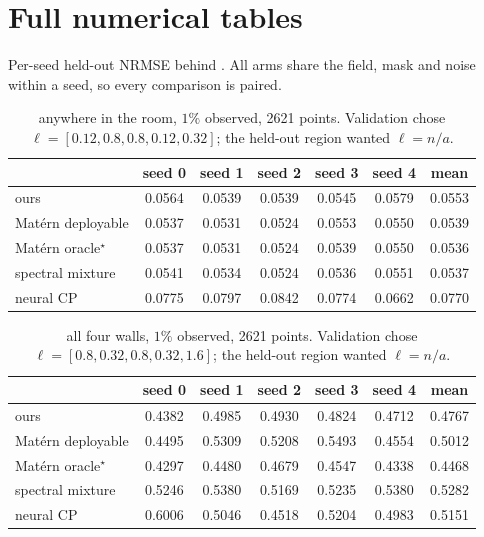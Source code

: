 \section{Full numerical tables}
\label{app:tables}

Per-seed held-out NRMSE behind .  All arms share the field, mask and noise within a seed, so every comparison is paired.

\begin{table}[h]
  \centering
  \caption{anywhere in the room, $1\%$ observed, 2621 points.  Validation chose $\ell = [0.12, 0.8, 0.8, 0.12, 0.32]$; the held-out region wanted $\ell = n/a$.}
  \small
  \begin{tabular}{lcccccc}
    \toprule
    & seed 0 & seed 1 & seed 2 & seed 3 & seed 4 & mean \\
    \midrule
    ours & 0.0564 & 0.0539 & 0.0539 & 0.0545 & 0.0579 & 0.0553 \\
    Mat\'ern deployable & 0.0537 & 0.0531 & 0.0524 & 0.0553 & 0.0550 & 0.0539 \\
    Mat\'ern oracle$^\star$ & 0.0537 & 0.0531 & 0.0524 & 0.0539 & 0.0550 & 0.0536 \\
    spectral mixture & 0.0541 & 0.0534 & 0.0524 & 0.0536 & 0.0551 & 0.0537 \\
    neural CP & 0.0775 & 0.0797 & 0.0842 & 0.0774 & 0.0662 & 0.0770 \\
    \bottomrule
  \end{tabular}
\end{table}

\begin{table}[h]
  \centering
  \caption{all four walls, $1\%$ observed, 2621 points.  Validation chose $\ell = [0.8, 0.32, 0.8, 0.32, 1.6]$; the held-out region wanted $\ell = n/a$.}
  \small
  \begin{tabular}{lcccccc}
    \toprule
    & seed 0 & seed 1 & seed 2 & seed 3 & seed 4 & mean \\
    \midrule
    ours & 0.4382 & 0.4985 & 0.4930 & 0.4824 & 0.4712 & 0.4767 \\
    Mat\'ern deployable & 0.4495 & 0.5309 & 0.5208 & 0.5493 & 0.4554 & 0.5012 \\
    Mat\'ern oracle$^\star$ & 0.4297 & 0.4480 & 0.4679 & 0.4547 & 0.4338 & 0.4468 \\
    spectral mixture & 0.5246 & 0.5380 & 0.5169 & 0.5235 & 0.5380 & 0.5282 \\
    neural CP & 0.6006 & 0.5046 & 0.4518 & 0.5204 & 0.4983 & 0.5151 \\
    \bottomrule
  \end{tabular}
\end{table}

